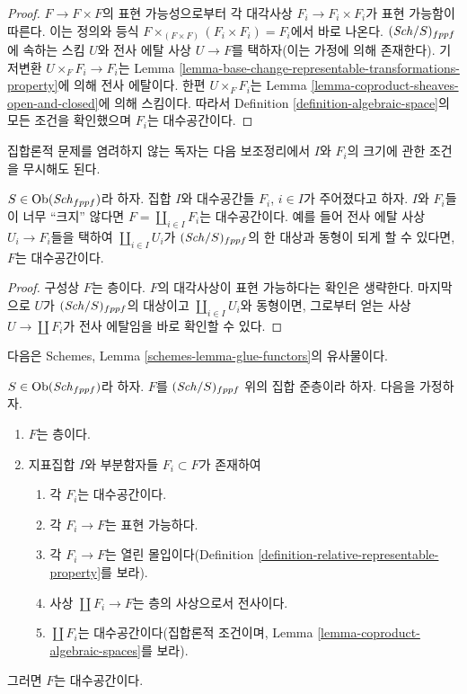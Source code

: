\begin{proof}
$F \to F \times F$의 표현 가능성으로부터 각 대각사상
$F_i \to F_i \times F_i$가 표현 가능함이 따른다. 이는 정의와 등식
$F \times_{(F \times F)} (F_i \times F_i) = F_i$에서 바로 나온다.
$(\mathit{Sch}/S)_{fppf}$에 속하는 스킴 $U$와 전사 에탈 사상
$U \to F$를 택하자(이는 가정에 의해 존재한다). 기저변환
$U \times_F F_i \to F_i$는 Lemma
\ref{lemma-base-change-representable-transformations-property}에 의해
전사 에탈이다. 한편 $U \times_F F_i$는 Lemma
\ref{lemma-coproduct-sheaves-open-and-closed}에 의해 스킴이다.
따라서 Definition \ref{definition-algebraic-space}의 모든 조건을
확인했으며 $F_i$는 대수공간이다.
\end{proof}

\noindent
집합론적 문제를 염려하지 않는 독자는 다음 보조정리에서 $I$와
$F_i$의 크기에 관한 조건을 무시해도 된다.

\begin{lemma}
\label{lemma-coproduct-algebraic-spaces}
$S \in \mathop{\mathrm{Ob}}\nolimits(\mathit{Sch}_{fppf})$라 하자.
집합 $I$와 대수공간들 $F_i$, $i \in I$가 주어졌다고 하자.
$I$와 $F_i$들이 너무 ``크지'' 않다면
$F = \coprod_{i \in I} F_i$는 대수공간이다. 예를 들어 전사 에탈 사상
$U_i \to F_i$들을 택하여 $\coprod_{i \in I} U_i$가
$(\mathit{Sch}/S)_{fppf}$의 한 대상과 동형이 되게 할 수 있다면,
$F$는 대수공간이다.
\end{lemma}

\begin{proof}
구성상 $F$는 층이다. $F$의 대각사상이 표현 가능하다는 확인은
생략한다. 마지막으로 $U$가 $(\mathit{Sch}/S)_{fppf}$의 대상이고
$\coprod_{i \in I} U_i$와 동형이면, 그로부터 얻는 사상
$U \to \coprod F_i$가 전사 에탈임을 바로 확인할 수 있다.
\end{proof}

\noindent
다음은 Schemes, Lemma \ref{schemes-lemma-glue-functors}의 유사물이다.

\begin{lemma}
\label{lemma-glueing-algebraic-spaces}
$S \in \mathop{\mathrm{Ob}}\nolimits(\mathit{Sch}_{fppf})$라 하자.
$F$를 $(\mathit{Sch}/S)_{fppf}$ 위의 집합 준층이라 하자.
다음을 가정하자.
\begin{enumerate}
\item $F$는 층이다.
\item 지표집합 $I$와 부분함자들 $F_i \subset F$가 존재하여
\begin{enumerate}
\item 각 $F_i$는 대수공간이다.
\item 각 $F_i \to F$는 표현 가능하다.
\item 각 $F_i \to F$는 열린 몰입이다(Definition
\ref{definition-relative-representable-property}를 보라).
\item 사상 $\coprod F_i \to F$는 층의 사상으로서 전사이다.
\item $\coprod F_i$는 대수공간이다(집합론적 조건이며, Lemma
\ref{lemma-coproduct-algebraic-spaces}를 보라).
\end{enumerate}
\end{enumerate}
그러면 $F$는 대수공간이다.
\end{lemma}

